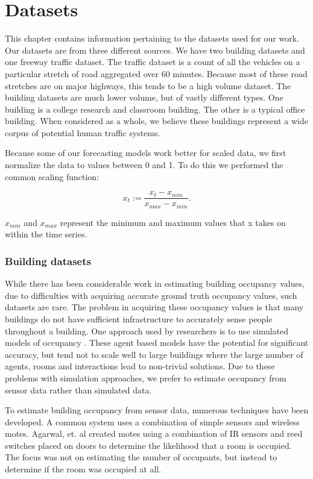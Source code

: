 \chapter{Datasets}

This chapter contains information pertaining to the datasets used for our work.  Our datasets are from three different sources.  We have two building datasets and one freeway traffic dataset.  The traffic dataset is a count of all the vehicles on a particular stretch of road aggregated over 60 minutes.  Because most of these road stretches are on major highways, this tends to be a high volume dataset.  The building datasets are much lower volume, but of vastly different types.  One building is a college research and classroom building.  The other is a typical office building.  When considered as a whole, we believe these buildings represent a wide corpus of potential human traffic systems.  

Because some of our forecasting models work better for scaled data, we first normalize the data to values between 0 and 1.  To do this we performed the common scaling function:

\begin{equation}
	x_{t} := \frac{x_{t} - x_{min}}{x_{max} - x_{min}}.
\end{equation}

$x_{min}$ and $x_{max}$ represent the minimum and maximum values that x takes on within the time series.

\subsection{Building datasets}
While there has been considerable work in estimating building occupancy values, due to difficulties with acquiring accurate ground truth occupancy values, such datasets are rare.  The problem in acquiring these occupancy values is that many buildings do not have sufficient infrastructure to accurately sense people throughout a building.  One approach used by researchers is to use simulated models of occupancy \cite{page2008, goldstein2010}.  These agent based models have the potential for significant accuracy, but tend not to scale well to large buildings where the large number of agents, rooms and interactions lead to non-trivial solutions.  Due to these problems with simulation approaches, we prefer to estimate occupancy from sensor data rather than simulated data.

To estimate building occupancy from sensor data, numerous techniques have been developed.  A common system uses a combination of simple sensors and wireless motes.  Agarwal, et. al \cite{agarwal2010} created motes using a combination of IR sensors and reed switches placed on doors to determine the likelihood that a room is occupied.  The focus was not on estimating the number of occupants, but instead to determine if the room was occupied at all.  

